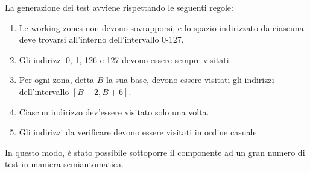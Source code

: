 \documentclass[11pt,a4paper]{article}
\begin{document}
La generazione dei test avviene rispettando le seguenti regole:
\begin{enumerate}
    \item Le working-zones non devono sovrapporsi, e lo spazio indirizzato da ciascuna deve trovarsi all'interno dell'intervallo 0-127.
    \item Gli indirizzi 0, 1, 126 e 127 devono essere sempre visitati.
    \item Per ogni zona, detta $B$ la sua base, devono essere visitati gli indirizzi dell'intervallo $[B - 2, B + 6]$.
    \item Ciascun indirizzo dev'essere visitato solo una volta.
    \item Gli indirizzi da verificare devono essere visitati in ordine casuale.
\end{enumerate}

In questo modo, è stato possibile sottoporre il componente ad un gran numero di test in maniera semiautomatica.
\end{document}
